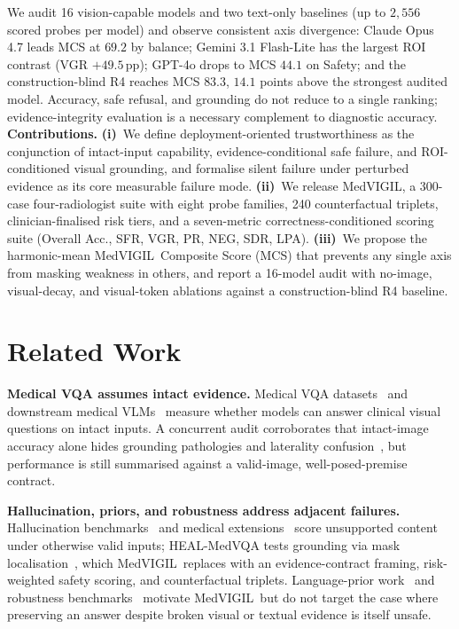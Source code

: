 \documentclass{article}
\newcommand{\medvigil}{MedVIGIL}
\newcommand{\sfr}{\textsc{SFR}}
\begin{document}
We audit 16 vision-capable models and two text-only baselines (up to $2{,}556$ scored probes per model) and observe consistent axis divergence: Claude Opus 4.7 leads MCS at $69.2$ by balance; Gemini 3.1 Flash-Lite has the largest ROI contrast (VGR $+49.5$\,pp); GPT-4o drops to MCS $44.1$ on Safety; and the construction-blind \textsc{R4} reaches MCS $83.3$, $14.1$ points above the strongest audited model. Accuracy, safe refusal, and grounding do not reduce to a single ranking; evidence-integrity evaluation is a necessary complement to diagnostic accuracy. \textbf{Contributions.} \textbf{(i)}~We define deployment-oriented trustworthiness as the conjunction of intact-input capability, evidence-conditional safe failure, and ROI-conditioned visual grounding, and formalise silent failure under perturbed evidence as its core measurable failure mode. \textbf{(ii)}~We release \medvigil, a 300-case four-radiologist suite with eight probe families, 240 counterfactual triplets, clinician-finalised risk tiers, and a seven-metric correctness-conditioned scoring suite (Overall Acc., \sfr, VGR, PR, NEG, SDR, LPA). \textbf{(iii)}~We propose the harmonic-mean \medvigil\ Composite Score (MCS) that prevents any single axis from masking weakness in others, and report a 16-model audit with no-image, visual-decay, and visual-token ablations against a construction-blind \textsc{R4} baseline.

\section{Related Work}
\label{sec:related_work}

\textbf{Medical VQA assumes intact evidence.} Medical VQA datasets~\cite{lau2018vqarad,liu2021slake,zhang2023pmcvqa} and downstream medical VLMs~\cite{li2023llavamed,moor2023medflamingo,wu2023radfm} measure whether models can answer clinical visual questions on intact inputs. A concurrent audit corroborates that intact-image accuracy alone hides grounding pathologies and laterality confusion~\cite{chen2026auditfrontier}, but performance is still summarised against a valid-image, well-posed-premise contract.

\textbf{Hallucination, priors, and robustness address adjacent failures.} Hallucination benchmarks~\cite{rohrbach2018chair,li2023pope} and medical extensions~\cite{chen2024medihallv1,chang2025medheval,gu2024medvh} score unsupported content under otherwise valid inputs; HEAL-MedVQA tests grounding via mask localisation~\cite{nguyen2025healmedicine}, which \medvigil\ replaces with an evidence-contract framing, risk-weighted safety scoring, and counterfactual triplets. Language-prior work~\cite{goyal2017vqa,agarwal2020causalvqa,lee2025vlindbench} and robustness benchmarks~\cite{hendrycks2019imagenetc,gokhale2020vqalol,guan2022domain} motivate \medvigil\ but do not target the case where preserving an answer despite broken visual or textual evidence is itself unsafe.
\end{document}

